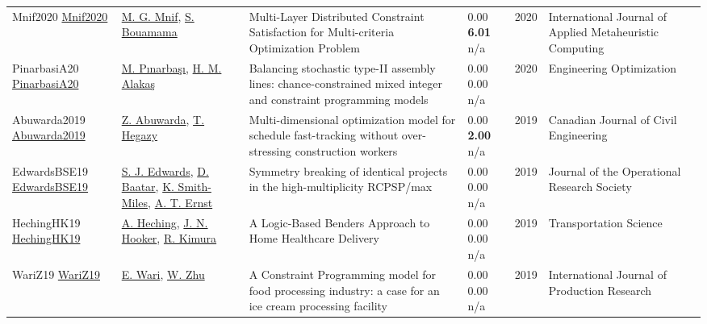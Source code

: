 {\begin{longtable}{p{3cm}p{5cm}p{10cm}p{1cm}rp{2.5cm}l}
Mnif2020 \href{http://dx.doi.org/10.4018/ijamc.2020040107}{Mnif2020} & \hyperref[auth:a1961]{M. G. Mnif}, \hyperref[auth:a1962]{S. Bouamama} & Multi-Layer Distributed Constraint Satisfaction for Multi-criteria Optimization Problem & \noindent{}\textcolor{black!50}{0.00} \textbf{6.01} n/a & 2020 & International Journal of Applied Metaheuristic Computing & \cite{Mnif2020}\\
PinarbasiA20 \href{http://dx.doi.org/10.1080/0305215x.2020.1716746}{PinarbasiA20} & \hyperref[auth:a1383]{M. Pınarbaşı}, \hyperref[auth:a763]{H. M. Alakaş} & Balancing stochastic type-II assembly lines: chance-constrained mixed integer and constraint programming models & \noindent{}\textcolor{black!50}{0.00} \textcolor{black!50}{0.00} n/a & 2020 & \cellcolor{red!20}Engineering Optimization & \cite{PinarbasiA20}\\
Abuwarda2019 \href{http://dx.doi.org/10.1139/cjce-2018-0544}{Abuwarda2019} & \hyperref[auth:a1518]{Z. Abuwarda}, \hyperref[auth:a1519]{T. Hegazy} & \cellcolor{gold!20}Multi-dimensional optimization model for schedule fast-tracking without over-stressing construction workers & \noindent{}\textcolor{black!50}{0.00} \textbf{2.00} n/a & 2019 & Canadian Journal of Civil Engineering & \cite{Abuwarda2019}\\
EdwardsBSE19 \href{http://dx.doi.org/10.1080/01605682.2019.1595192}{EdwardsBSE19} & \hyperref[auth:a891]{S. J. Edwards}, \hyperref[auth:a892]{D. Baatar}, \hyperref[auth:a893]{K. Smith-Miles}, \hyperref[auth:a468]{A. T. Ernst} & Symmetry breaking of identical projects in the high-multiplicity RCPSP/max & \noindent{}\textcolor{black!50}{0.00} \textcolor{black!50}{0.00} n/a & 2019 & \cellcolor{red!20}Journal of the Operational Research Society & \cite{EdwardsBSE19}\\
HechingHK19 \href{http://dx.doi.org/10.1287/trsc.2018.0830}{HechingHK19} & \hyperref[auth:a1020]{A. Heching}, \hyperref[auth:a160]{J. N. Hooker}, \hyperref[auth:a1021]{R. Kimura} & \cellcolor{gold!20}A Logic-Based Benders Approach to Home Healthcare Delivery & \noindent{}\textcolor{black!50}{0.00} \textcolor{black!50}{0.00} n/a & 2019 & \cellcolor{red!20}Transportation Science & \cite{HechingHK19}\\
WariZ19 \href{http://dx.doi.org/10.1080/00207543.2019.1571250}{WariZ19} & \hyperref[auth:a838]{E. Wari}, \hyperref[auth:a839]{W. Zhu} & A Constraint Programming model for food processing industry: a case for an ice cream processing facility & \noindent{}\textcolor{black!50}{0.00} \textcolor{black!50}{0.00} n/a & 2019 & \cellcolor{red!20}International Journal of Production Research & \cite{WariZ19}\\

\end{longtable}}
